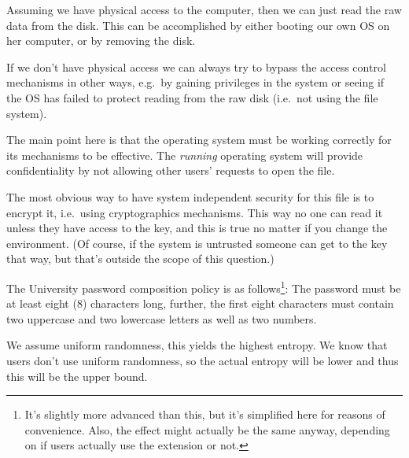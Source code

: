 \documentclass[svv,addpoints]{miunexam}
\begin{document}
\begin{questions}
\begin{solution}
    Assuming we have physical access to the computer, then we can just read the 
    raw data from the disk.
    This can be accomplished by either booting our own OS on her computer, or 
    by removing the disk.

    If we don't have physical access we can always try to bypass the access 
    control mechanisms in other ways, e.g.\ by gaining privileges in the system 
    or seeing if the OS has failed to protect reading from the raw disk (i.e.\ 
    not using the file system).

    The main point here is that the operating system must be working correctly 
    for its mechanisms to be effective.
    The \emph{running} operating system will provide confidentiality by not 
    allowing other users' requests to open the file.

    The most obvious way to have system independent security for this file is 
    to encrypt it, i.e.\ using cryptographics mechanisms.
    This way no one can read it unless they have access to the key, and this is 
    true no matter if you change the environment.
    (Of course, if the system is untrusted someone can get to the key that way, 
    but that's outside the scope of this question.)
  \end{solution}


  \question\label{q:infogain}
  The University password composition policy is as follows\footnote{%
    It's slightly more advanced than this, but it's simplified here for reasons 
    of convenience.
    Also, the effect might actually be the same anyway, depending on if users 
    actually use the extension or not.
  }:
  The password must be at least eight (8) characters long, further, the first 
  eight characters must contain two uppercase and two lowercase letters as well 
  as two numbers.

  \begin{solution}
    We assume uniform randomness, this yields the highest entropy.
    We know that users don't use uniform randomness, so the actual entropy will 
    be lower and thus this will be the upper bound.


\end{solution}
\end{questions}
\end{document}
